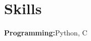 
\section{Skills}

    \itemizeCVBegin
    
        \small{\item{
            \textbf{Programming:}{Python, C} \\ \vspace{3pt}
        }}
    
    \itemizeCVEnd
    
